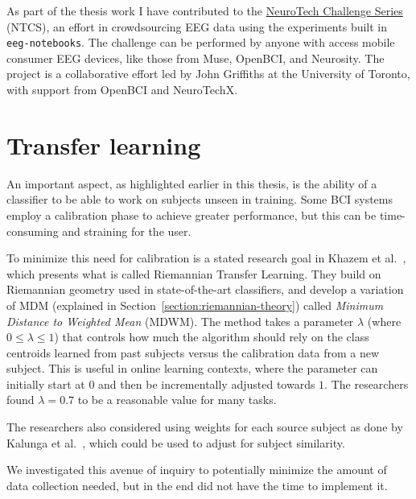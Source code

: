 
    As part of the thesis work I have contributed to the \href{https://neurotech-challenge.com/}{NeuroTech Challenge Series} (NTCS), an effort in crowdsourcing EEG data using the experiments built in \texttt{eeg-notebooks}. The challenge can be performed by anyone with access mobile consumer EEG devices, like those from Muse, OpenBCI, and Neurosity\@. The project is a collaborative effort led by John Griffiths at the University of Toronto, with support from OpenBCI and NeuroTechX.\label{section:ntcs}


\section{Transfer learning}\label{section:transfer-learning}

An important aspect, as highlighted earlier in this thesis, is the ability of a classifier to be able to work on subjects unseen in training. Some BCI systems employ a calibration phase to achieve greater performance, but this can be time-consuming and straining for the user.

To minimize this need for calibration is a stated research goal in Khazem et al.~\cite{khazem_minimizing_2021}, which presents what is called Riemannian Transfer Learning. They build on Riemannian geometry used in state-of-the-art classifiers, and develop a variation of MDM (explained in Section~\ref{section:riemannian-theory}) called \emph{Minimum Distance to Weighted Mean} (MDWM). The method takes a parameter $\lambda$ (where $0 \leq \lambda \leq 1$) that controls how much the algorithm should rely on the class centroids learned from past subjects versus the calibration data from a new subject. This is useful in online learning contexts, where the parameter can initially start at $0$ and then be incrementally adjusted towards $1$. The researchers found $\lambda = 0.7$ to be a reasonable value for many tasks. 

The researchers also considered using weights for each source subject as done by Kalunga et al.~\cite{kalunga_transfer_2018}, which could be used to adjust for subject similarity.

We investigated this avenue of inquiry to potentially minimize the amount of data collection needed, but in the end did not have the time to implement it.
